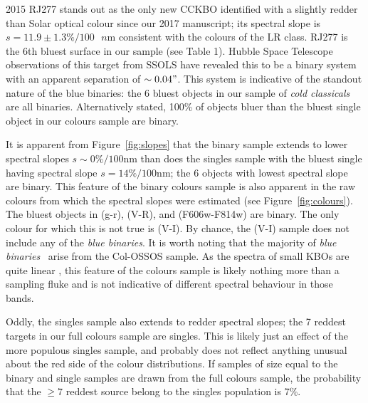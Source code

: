 \documentclass[twocolumn]{aastex63}
\newcommand{\coldclassicals}{{\it cold classicals}}
\newcommand{\bluebinaries}{{\it blue binaries}}
\begin{document}
2015 RJ277 stands out as the only new CCKBO identified with a slightly redder than Solar optical colour since our 2017 manuscript;  its spectral slope is $s=11.9\pm1.3 \%/100\mbox{ $n$m}$ consistent with the colours of the LR class. RJ277 is the 6th bluest surface in our sample (see Table 1). Hubble Space Telescope observations of this target from SSOLS have revealed this to be a binary system with an apparent separation of $\sim0.04"$. This system is indicative of the standout nature of the blue binaries: the 6 bluest objects in our sample of \coldclassicals~ are all binaries. Alternatively stated, 100\% of objects bluer than the bluest single object in our colours sample are binary.


It is apparent from Figure~\ref{fig:slopes} that the binary sample extends to lower spectral slopes  $s\sim0 \%/100\mbox{nm}$ than does the singles sample with the bluest single having spectral slope $s=14 \%/100\mbox{nm}$; the 6 objects with lowest spectral slope are binary. This feature of the binary colours sample is also apparent in the raw colours from which the spectral slopes were estimated (see Figure~\ref{fig:colours}). The bluest objects in (g-r), (V-R), and (F606w-F814w) are binary. The only colour for which this is not true is (V-I). By chance, the (V-I) sample does not include any of the \bluebinaries. It is worth noting that the majority of \bluebinaries~ arise from the Col-OSSOS sample. As the spectra of small KBOs are quite linear \citep[eg.][]{Barucci2011,Peixinho2015}, this feature of the colours sample is likely nothing more than a sampling fluke and is not indicative of different spectral behaviour in those bands.

Oddly, the singles sample also extends to redder spectral slopes; the 7 reddest targets in our full colours sample are singles. This is likely just an effect of the more populous singles sample, and probably does not reflect anything unusual about the red side of the colour distributions. If samples of size equal to the binary and single samples are drawn from the full colours sample, the probability that  the $\geq7$ reddest source belong to the singles population is 7\%.
\end{document}
